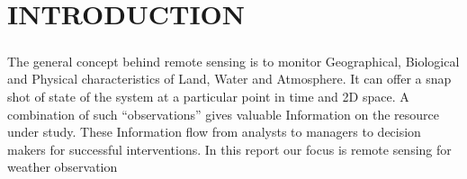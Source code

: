 \chapter*{\normalsize{\textbf{INTRODUCTION}}}
\paragraph{}
The general concept behind remote sensing is to monitor Geographical, Biological and Physical characteristics of Land, Water and Atmosphere.
It can offer a snap shot of state of the system at a particular point in time and 2D space.
A combination of such “observations” gives valuable Information on the resource under study.
These Information flow from analysts to managers to decision makers for successful interventions. 
In this report our focus is remote sensing for weather observation 